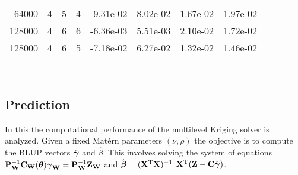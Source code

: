 \documentclass[11pt,final]{amsart}       %
\begin{document}
\begin{table*}[htpb]
\begin{center}
\begin{tabular}{ r r r r r r r r r r}
64000 & 4 & 5 & 4 & -9.31e-02 &  8.02e-02 & 1.67e-02 & 1.97e-02 \\
128000 & 4 & 6 & 6 & -6.36e-03 & 5.51e-03 & 2.10e-02 & 1.72e-02 \\
128000 & 4 & 6 & 5 & -7.18e-02 & 6.27e-02 & 1.32e-02 & 1.46e-02 \\ 
\end{tabular}
\\
\bigskip
\end{center}
\label{numericalresults:table2}
\end{table*}



\subsection{Prediction}

In this the computational performance of the multilevel Kriging solver
is analyzed. Given a fixed Mat\'{e}rn parameters $(\nu,\rho)$ the
objective is to compute the BLUP vectors $\hat {\boldsymbol{\gamma}}$ and $\hat
\beta$. This involves solving the system of equations $\mathbf{P}^{-1}_{\mathbf{W}}
\mathbf{C}_{\mathbf{W}}(\boldsymbol{\theta}) \boldsymbol{\gamma}_{\mathbf{W}} = \mathbf{P}^{-1}_{\mathbf{W}} \mathbf{Z}_{\mathbf{W}}$ and $\hat
{\boldsymbol{\beta}} = (\mathbf{X}^{\rm T} \mathbf{X})^{-1}$ $\mathbf{X}^{\rm T}(\mathbf{Z} - \mathbf{C} \hat {\boldsymbol{\gamma}})$.
\end{document}
